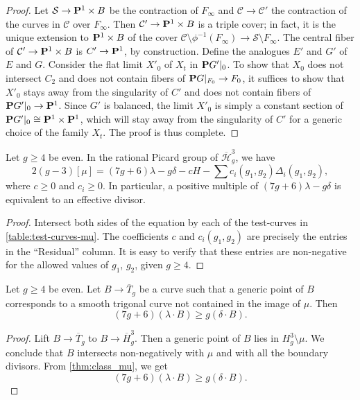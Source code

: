 \documentclass{amsart}
\renewcommand {\P}{{\bf P}}
\newcommand{\orb}[1]{{\mathcal #1}}     %
\renewcommand {\o}[1]{\overline{#1}}
\renewcommand{\o}{\overline}
\begin{document}
\begin{proof}
  Let $\orb S \to \P^1 \times B$ be the contraction of $F_\infty$ and $\orb C \to \orb C'$  the contraction of the curves in $\orb C$ over $F_\infty$. Then $\orb C' \to \P^1 \times B$ is a triple cover; in fact, it is the unique extension to $\P^1 \times B$ of the cover $\orb C \setminus \phi^{-1}(F_\infty) \to \orb S \setminus F_\infty$. The central fiber of $\orb C' \to \P^1 \times B$ is $C' \to \P^1$, by construction. Define the analogues $E'$ and $G'$ of $E$ and $G$. Consider the flat limit $X'_0$ of $X_t$ in $\P G'|_0$. To show that $X_0$ does not intersect $C_2$ and does not contain fibers of $\P G|_{F_0}\to F_0$, it suffices to show that $X'_0$ stays away from the singularity of $C'$ and does not contain fibers of $\P G'|_0 \to \P^1$. Since $G'$ is balanced, the limit $X'_0$ is simply a constant section of $\P G'|_0 \cong \P^1 \times \P^1$, which will stay away from the singularity of $C'$ for a generic choice of the family $X_t$. The proof is thus complete.
\end{proof}

\begin{proposition}\label{thm:class_mu}
  Let $g \geq 4$ be even. In the rational Picard group of $\o{\orb H}^3_g$, we have
  \[ 2(g-3)[\mu] = (7g+6)\lambda - g \delta - c H - \sum c_i(g_1,g_2)\Delta_i(g_1,g_2),\]
where $c \geq 0$ and $c_i \geq 0$. In particular, a positive multiple of $(7g+6)\lambda - g \delta$ is equivalent to an effective divisor.
\end{proposition}
\begin{proof}
  Intersect both sides of the equation by each of the test-curves in \autoref{table:test-curves-mu}. The coefficients $c$ and $c_i(g_1,g_2)$ are precisely the entries in the ``Residual'' column. It is easy to verify that these entries are non-negative for the allowed values of $g_1$, $g_2$, given $g \geq 4$.
\end{proof}
\begin{corollary}\label{thm:sweeping_slope_sharp_even}
  Let $g \geq 4$ be even. Let $B \to \o T_g$ be a curve such that a generic point of $B$ corresponds to a smooth trigonal curve not contained in the image of $\mu$. Then 
\[ (7g+6) (\lambda \cdot B) \geq g (\delta \cdot B).\]
\end{corollary}
\begin{proof}
  Lift $B \to \o T_g$ to $B \to \o{H}^3_g$. Then a generic point of $B$ lies in $H^3_g \setminus \mu$.  We conclude that $B$ intersects non-negatively with $\mu$ and with all the boundary divisors. From \autoref{thm:class_mu}, we get
\[ (7g+6) (\lambda \cdot B) \geq g (\delta \cdot B).\]
\end{proof}
\end{document}
